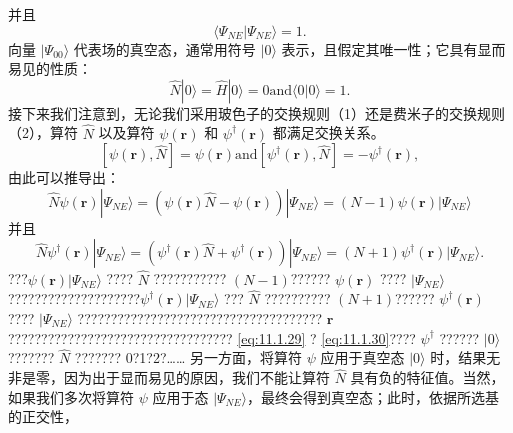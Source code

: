 并且
\begin{equation}\tag{11.1.11}\label{eq:11.1.11}
\langle \Psi _ { N E } | \Psi _ { N E } \rangle = 1 .
\end{equation}
向量 \(|\Psi_{00}\rangle\) 代表场的真空态，通常用符号 \(|0\rangle\) 表示，且假定其唯一性；它具有显而易见的性质：
\begin{equation}\tag{11.1.12}\label{eq:11.1.12}
\hat { N } | 0 \rangle = \hat { H } | 0 \rangle = 0  \mathrm { a n d }  \langle 0 | 0 \rangle = 1 .
\end{equation}
接下来我们注意到，无论我们采用玻色子的交换规则（1）还是费米子的交换规则（2），算符 \(\hat{N}\) 以及算符 \(\psi(\boldsymbol{r})\) 和 \(\psi^{\dagger}(\boldsymbol{r})\) 都满足交换关系。
\begin{equation}\tag{11.1.13}\label{eq:11.1.13}
[ \psi ( \pmb { r } ) , \hat { N } ] = \psi ( \pmb { r } )  \mathrm { a n d }  [ \psi ^{\dagger} ( \pmb { r } ) , \hat { N } ] = - \psi ^{\dagger} ( \pmb { r } ) ,
\end{equation}
由此可以推导出：
\begin{equation}\tag{11.1.14}\label{eq:11.1.14}
\hat { N } \psi \left( \pmb { r } \right) | \Psi _ { N E } \rangle = \left( \psi \left( \pmb { r } \right) \hat { N } - \psi \left( \pmb { r } \right) \right) | \Psi _ { N E } \rangle = ( N - 1 ) \psi \left( \pmb { r } \right) | \Psi _ { N E } \rangle
\end{equation}
并且
\begin{equation}\tag{11.1.15}\label{eq:11.1.15}
\hat { N } \psi ^{\dagger} ( \pmb { r } ) | \Psi _ { N E } \rangle = \left( \psi ^{\dagger} ( \pmb { r } ) \hat { N } + \psi ^{\dagger} ( \pmb { r } ) \right) | \Psi _ { N E } \rangle = ( N + 1 ) \psi ^{\dagger} ( \pmb { r } ) | \Psi _ { N E } \rangle .
\end{equation}
???\(\psi(\boldsymbol{r})|\Psi_{NE}\rangle\) ???? \(\hat{N}\) ??????????? \((N-1)\)?????? \(\psi(\boldsymbol{r})\) ???? \(|\Psi_{NE}\rangle\) ????????????????????\(\psi^\dagger(\boldsymbol{r})|\Psi_{NE}\rangle\) ??? \(\hat{N}\) ?????????? \((N+1)\)?????? \(\psi^\dagger(\boldsymbol{r})\) ???? \(|\Psi_{NE}\rangle\) ????????????????????????????????????? \(\boldsymbol{r}\) ?????????????????????????????????? \autoref{eq:11.1.29} ? \autoref{eq:11.1.30}???? \(\psi^\dagger\) ?????? \(|0\rangle\)??????? \(\hat{N}\) ??????? 0?1?2?\ldots\ldots{}
另一方面，将算符 \(\psi\) 应用于真空态 \(|0\rangle\) 时，结果无非是零，因为出于显而易见的原因，我们不能让算符 \(\hat{N}\) 具有负的特征值。当然，如果我们多次将算符 \(\psi\) 应用于态 \(|\Psi_{NE}\rangle\)，最终会得到真空态；此时，依据所选基的正交性，
